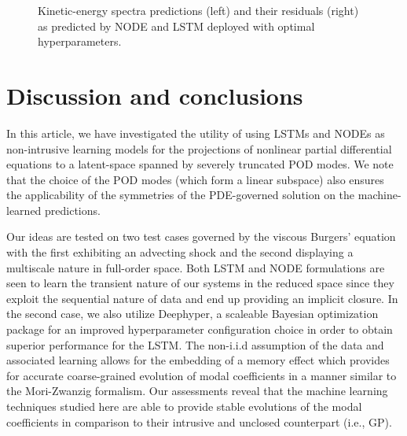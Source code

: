 \documentclass[preprint,12pt]{elsarticle}
\begin{document}
\begin{figure}
	\centering
	\caption{Kinetic-energy spectra predictions (left) and their residuals (right) as predicted by NODE and LSTM deployed with optimal hyperparameters.}
	\label{Figure18}
\end{figure}


\section{Discussion and conclusions}

In this article, we have investigated the utility of using LSTMs and NODEs as non-intrusive learning models for the projections of nonlinear partial differential equations to a latent-space spanned by severely truncated POD modes. We note that the choice of the POD modes (which form a linear subspace) also ensures the applicability of the symmetries of the PDE-governed solution on the machine-learned predictions.

Our ideas are tested on two test cases governed by the viscous Burgers' equation with the first exhibiting an advecting shock and the second displaying a multiscale nature in full-order space. Both LSTM and NODE formulations are seen to learn the transient nature of our systems in the reduced space since they exploit the sequential nature of data and end up providing an implicit closure. In the second case, we also utilize Deephyper, a scaleable Bayesian optimization package for an improved hyperparameter configuration choice in order to obtain superior performance for the LSTM. The non-i.i.d assumption of the data and associated learning allows for the embedding of a memory effect which provides for accurate coarse-grained evolution of modal coefficients in a manner similar to the Mori-Zwanzig formalism. Our assessments reveal that the machine learning techniques studied here are able to provide stable evolutions of the modal coefficients in comparison to their intrusive and unclosed counterpart (i.e., GP). 
\end{document}
